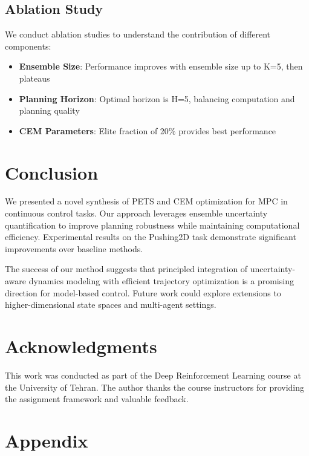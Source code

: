 \documentclass[10pt,twocolumn,letterpaper]{article}
\begin{document}
\subsection{Ablation Study}

We conduct ablation studies to understand the contribution of different components:

\begin{itemize}
\item \textbf{Ensemble Size}: Performance improves with ensemble size up to K=5, then plateaus
\item \textbf{Planning Horizon}: Optimal horizon is H=5, balancing computation and planning quality
\item \textbf{CEM Parameters}: Elite fraction of 20\% provides best performance
\end{itemize}

\section{Conclusion}

We presented a novel synthesis of PETS and CEM optimization for MPC in continuous control tasks. Our approach leverages ensemble uncertainty quantification to improve planning robustness while maintaining computational efficiency. Experimental results on the Pushing2D task demonstrate significant improvements over baseline methods.

The success of our method suggests that principled integration of uncertainty-aware dynamics modeling with efficient trajectory optimization is a promising direction for model-based control. Future work could explore extensions to higher-dimensional state spaces and multi-agent settings.

\section*{Acknowledgments}

This work was conducted as part of the Deep Reinforcement Learning course at the University of Tehran. The author thanks the course instructors for providing the assignment framework and valuable feedback.




\appendix

\section{Appendix}
\end{document}
